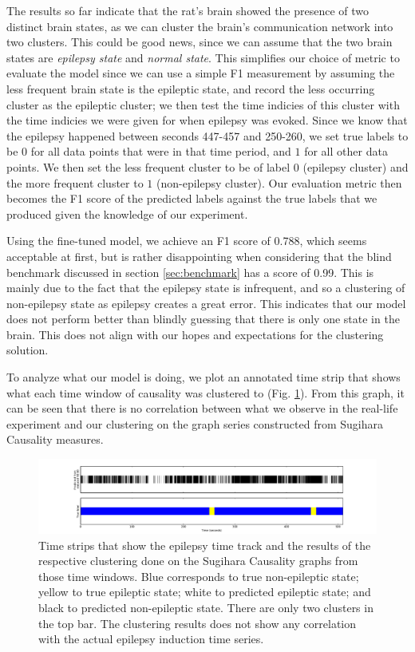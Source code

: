 The results so far indicate that the rat's brain showed the presence of two distinct brain states, as we can cluster the brain's communication network into two clusters. This could be good news, since we can assume that the two brain states are \textit{epilepsy state} and \textit{normal state}. This simplifies our choice of metric to evaluate the model since we can use a simple F1 measurement by assuming the less frequent brain state is the epileptic state, and record the less occurring cluster as the epileptic cluster; we then test the time indicies of this cluster with the time indicies we were given for when epilepsy was evoked. Since we know that the epilepsy happened between seconds 447-457 and 250-260, we set true labels to be $0$ for all data points that were in that time period, and $1$ for all other data points. We then set the less frequent cluster to be of label $0$ (epilepsy cluster) and the more frequent cluster to $1$ (non-epilepsy cluster). Our evaluation metric then becomes the F1 score of the predicted labels against the true labels that we produced given the knowledge of our experiment.

Using the fine-tuned model, we achieve an F1 score of 0.788, which seems acceptable at first, but is rather disappointing when considering that the blind benchmark discussed in section \ref{sec:benchmark} has a score of 0.99. This is mainly due to the fact that the epilepsy state is infrequent, and so a clustering of non-epilepsy state as epilepsy creates a great error. This indicates that our model does not perform better than blindly guessing that there is only one state in the brain. This does not align with our hopes and expectations for the clustering solution. 

To analyze what our model is doing, we plot an annotated time strip that shows what each time window of causality was clustered to (Fig. \ref{fig:strip_visual}). From this graph, it can be seen that there is no correlation between what we observe in the real-life experiment and our clustering on the graph series constructed from Sugihara Causality measures. 

\begin{figure}[H]
  \centering
  \includegraphics[width=\linewidth]{figures/strip_visual.pdf}
  \caption{Time strips that show the epilepsy time track and the results of the respective clustering done on the Sugihara Causality graphs from those time windows. Blue corresponds to true non-epileptic state; yellow to true epileptic state; white to predicted epileptic state; and black to predicted non-epileptic state. There are only two clusters in the top bar. The clustering results does not show any correlation with the actual epilepsy induction time series.}
  \label{fig:strip_visual}
\end{figure}


